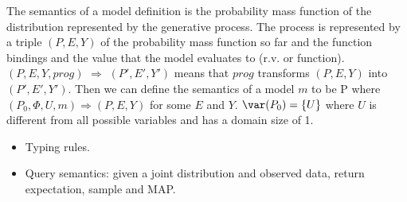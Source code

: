 The semantics of a model definition is the probability mass function of the
distribution represented by the generative process. The process is represented
by a triple $(P, E, Y)$ of the probability mass function so far and the
function bindings and the value that the model evaluates to (r.v. or function).
$(P, E, Y, prog)$ $\Rightarrow$ $(P', E', Y')$ means that $prog$ transforms
$(P, E, Y)$ into $(P', E', Y')$. Then we can define the semantics of a model
$m$ to be P where $(P_0, \Phi, U, m) \Rightarrow (P, E, Y)$ for some $E$ and
$Y$. $\var(P_0) = \{U\}$ where $U$ is different from all possible variables and
has a domain size of 1.


\begin{itemize}
\item Typing rules. 

\item Query semantics: given a joint distribution
and observed data,  return expectation, sample and MAP.

\end{itemize}

